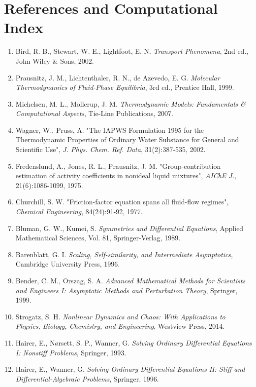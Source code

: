 \documentclass[11pt,a4paper]{article}
\begin{document}
\section{References and Computational Index}


\begin{enumerate}[leftmargin=*]
    \item Bird, R. B., Stewart, W. E., Lightfoot, E. N. \textit{Transport Phenomena}, 2nd ed., John Wiley \& Sons, 2002.
    \item Prausnitz, J. M., Lichtenthaler, R. N., de Azevedo, E. G. \textit{Molecular Thermodynamics of Fluid-Phase Equilibria}, 3rd ed., Prentice Hall, 1999.
    \item Michelsen, M. L., Mollerup, J. M. \textit{Thermodynamic Models: Fundamentals \& Computational Aspects}, Tie-Line Publications, 2007.
    \item Wagner, W., Pruss, A. "The IAPWS Formulation 1995 for the Thermodynamic Properties of Ordinary Water Substance for General and Scientific Use", \textit{J. Phys. Chem. Ref. Data}, 31(2):387-535, 2002.
    \item Fredenslund, A., Jones, R. L., Prausnitz, J. M. "Group-contribution estimation of activity coefficients in nonideal liquid mixtures", \textit{AIChE J.}, 21(6):1086-1099, 1975.
    \item Churchill, S. W. "Friction-factor equation spans all fluid-flow regimes", \textit{Chemical Engineering}, 84(24):91-92, 1977.
    \item Bluman, G. W., Kumei, S. \textit{Symmetries and Differential Equations}, Applied Mathematical Sciences, Vol. 81, Springer-Verlag, 1989.
    \item Barenblatt, G. I. \textit{Scaling, Self-similarity, and Intermediate Asymptotics}, Cambridge University Press, 1996.
    \item Bender, C. M., Orszag, S. A. \textit{Advanced Mathematical Methods for Scientists and Engineers I: Asymptotic Methods and Perturbation Theory}, Springer, 1999.
    \item Strogatz, S. H. \textit{Nonlinear Dynamics and Chaos: With Applications to Physics, Biology, Chemistry, and Engineering}, Westview Press, 2014.
    \item Hairer, E., N\o rsett, S. P., Wanner, G. \textit{Solving Ordinary Differential Equations I: Nonstiff Problems}, Springer, 1993.
    \item Hairer, E., Wanner, G. \textit{Solving Ordinary Differential Equations II: Stiff and Differential-Algebraic Problems}, Springer, 1996.

\end{enumerate}
\end{document}
